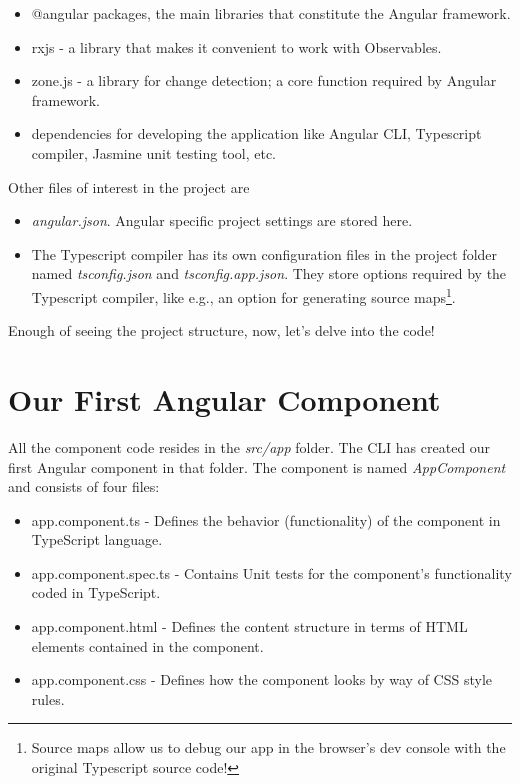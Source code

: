 \documentclass{report}
\begin{document}
\begin{itemize}
	\item @angular packages, the main libraries that constitute the Angular framework.
	\item rxjs - a library that makes it convenient to work with Observables.
	\item zone.js - a library for change detection; a core function required by Angular framework.
	\item dependencies for developing the application like Angular CLI, Typescript compiler, Jasmine unit testing tool, etc.
\end{itemize}

Other files of interest in the project are
\begin{itemize}
	\item \textsl{angular.json}. Angular specific project settings are stored here.
	\item The Typescript compiler has its own configuration files in the project folder named \textsl{tsconfig.json} and \textsl{tsconfig.app.json}. They store options required by the Typescript compiler, like e.g., an option for generating source maps\footnote{Source maps allow us to debug our app in the browser's dev console with the original Typescript source code!}.
\end{itemize}

Enough of seeing the project structure, now, let's delve into the code!

\section{Our First Angular Component}
All the component code resides in the \textsl{src/app} folder. The CLI has created our first Angular component in that folder. The component is named \textsl{AppComponent} and consists of four files:

\begin{itemize}
	\item app.component.ts - Defines the behavior (functionality) of the component in TypeScript language.
	\item app.component.spec.ts - Contains Unit tests for the component's functionality coded in TypeScript.
	\item app.component.html - Defines the content structure in terms of HTML elements contained in the component.
	\item app.component.css - Defines how the component looks by way of CSS style rules.
\end{itemize}
\end{document}
